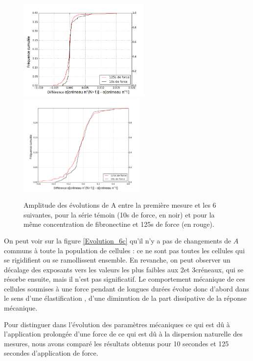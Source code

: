 \begin{figure}
\includegraphics[height=5cm]{Figures/A_diff_seul.png} 
\includegraphics[height=5cm]{Figures/E_diff_seul.png}
\caption{Amplitude des évolutions de A entre la première mesure et les 6 suivantes, pour la série témoin (10s de force, en noir) et pour la même concentration de fibronectine et 125s de force (en rouge).}
\label{Diff}
\end{figure}


On peut voir sur la figure \ref{Evolution_6c} qu'il n'y a pas de changements de $A$ communs à toute la population de cellules : ce ne sont pas toutes les cellules qui se rigidifient ou se ramollissent ensemble. 
En revanche, on peut observer un décalage des exposants vers les valeurs les plus faibles aux 2\ieme  et 3\ieme créneaux, qui se résorbe ensuite, mais il n'est pas significatif. 
Le comportement mécanique de ces cellules soumises à une force pendant de longues durées évolue donc d'abord dans le sens d'une \og élastification \fg , d'une diminution de la part dissipative de la réponse mécanique. 

Pour distinguer dans l’évolution des paramètres mécaniques ce qui est dû à l’application prolongée d’une force de ce qui est dû à la dispersion naturelle des mesures, nous avons comparé les résultats obtenus pour 10 secondes et 125 secondes d’application de force.

